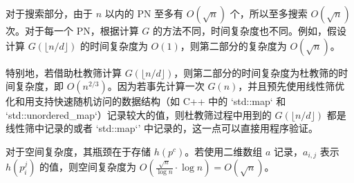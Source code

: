 对于搜索部分，由于 $n$ 以内的 PN 至多有 $O(\sqrt{n})$ 个，所以至多搜索 $O(\sqrt{n})$ 次。对于每一个 PN，根据计算 $G$ 的方法不同，时间复杂度也不同。例如，假设计算 $G\!\left(\lfloor n/d \rfloor\right)$ 的时间复杂度为 $O(1)$，则第二部分的复杂度为 $O(\sqrt{n})$。

特别地，若借助杜教筛计算 $G\!\left(\lfloor n/d \rfloor\right)$，则第二部分的时间复杂度为杜教筛的时间复杂度，即 $O(n^{2/3})$。因为若事先计算一次 $G(n)$，并且预先使用线性筛优化和用支持快速随机访问的数据结构（如 C++ 中的 `std::map` 和 `std::unordered\_map`）记录较大的值，则杜教筛过程中用到的 $G\!\left(\lfloor n/d \rfloor\right)$ 都是线性筛中记录的或者 `std::map`' 中记录的，这一点可以直接用程序验证。

对于空间复杂度，其瓶颈在于存储 $h(p^c)$。若使用二维数组 $a$ 记录，$a_{i,j}$ 表示 $h(p_i^j)$ 的值，则空间复杂度为 $O\!\left(\frac{\sqrt{n}}{\log n} \cdot \log n\right) = O(\sqrt{n})$。